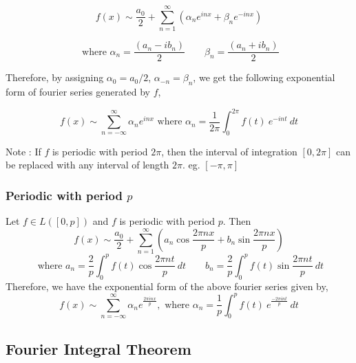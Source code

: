 	\[ f(x) \sim \frac{a_0}{2} + \sum_{n=1}^\infty \left( \alpha_n e^{inx} + \beta_n e^{-inx} \right) \]

	\[ \text{ where } \alpha_n = \frac{(a_n - ib_n)}{2} \qquad \beta_n = \frac{(a_n+ib_n)}{2} \]

	Therefore, by assigning \(\alpha_0 = a_0/2\), \(\alpha_{-n} = \beta_n\), we get the following exponential form of fourier series generated by $f$,

	\[ f(x) \sim \sum_{n = -\infty}^\infty \alpha_n e^{inx} \text{ where } \alpha_n = \frac{1}{2\pi} \int_0^{2\pi} f(t)\ e^{-int}\ dt \]

	Note : If $f$ is periodic with period $2\pi$, then the interval of integration $[0,2\pi]$ can be replaced with any interval of length $2\pi$. eg. $[-\pi,\pi]$

\subsubsection{Periodic with period $p$}
	Let \(f \in L([0,p])\) and $f$ is periodic with period $p$. Then
	\[ f(x) \sim \frac{a_0}{2} + \sum_{n=1}^\infty \left( a_n \cos \frac{2\pi nx}{p} + b_n \sin \frac{2\pi nx}{p} \right) \]
	\[ \text{ where } a_n = \frac{2}{p} \int_0^p f(t) \cos \frac{2\pi nt}{p}\ dt \qquad b_n = \frac{2}{p} \int_0^p f(t) \sin \frac{2\pi nt}{p}\ dt \]
	Therefore, we have the exponential form of the above fourier series given by,
	\[ f(x) \sim \sum_{n = -\infty}^\infty \alpha_n e^\frac{2\pi inx}{p},\text{ where } \alpha_n = \frac{1}{p} \int_0^p f(t)\ e^\frac{-2\pi int}{p}\ dt \]
	
\subsection{Fourier Integral Theorem}

